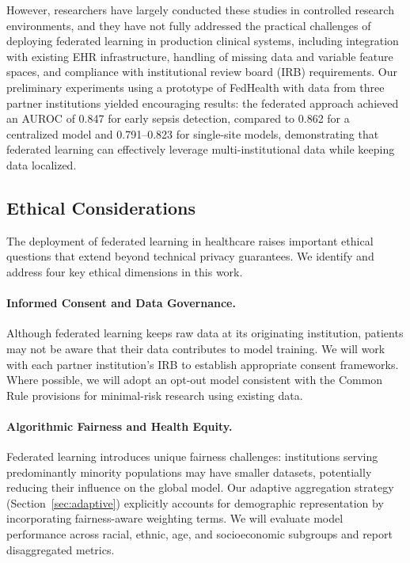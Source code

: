 \documentclass[12pt,letterpaper]{article}
\begin{document}
However, researchers have largely conducted these studies in controlled research environments, and they have not fully addressed the practical challenges of deploying federated learning in production clinical systems, including integration with existing EHR infrastructure, handling of missing data and variable feature spaces, and compliance with institutional review board (IRB) requirements. Our preliminary experiments using a prototype of FedHealth with data from three partner institutions yielded encouraging results: the federated approach achieved an AUROC of 0.847 for early sepsis detection, compared to 0.862 for a centralized model and 0.791--0.823 for single-site models, demonstrating that federated learning can effectively leverage multi-institutional data while keeping data localized.

\subsection{Ethical Considerations}
\label{sec:ethics}

The deployment of federated learning in healthcare raises important ethical questions that extend beyond technical privacy guarantees. We identify and address four key ethical dimensions in this work.

\paragraph{Informed Consent and Data Governance.} Although federated learning keeps raw data at its originating institution, patients may not be aware that their data contributes to model training. We will work with each partner institution's IRB to establish appropriate consent frameworks. Where possible, we will adopt an opt-out model consistent with the Common Rule provisions for minimal-risk research using existing data.

\paragraph{Algorithmic Fairness and Health Equity.} Federated learning introduces unique fairness challenges: institutions serving predominantly minority populations may have smaller datasets, potentially reducing their influence on the global model. Our adaptive aggregation strategy (Section~\ref{sec:adaptive}) explicitly accounts for demographic representation by incorporating fairness-aware weighting terms. We will evaluate model performance across racial, ethnic, age, and socioeconomic subgroups and report disaggregated metrics.
\end{document}
